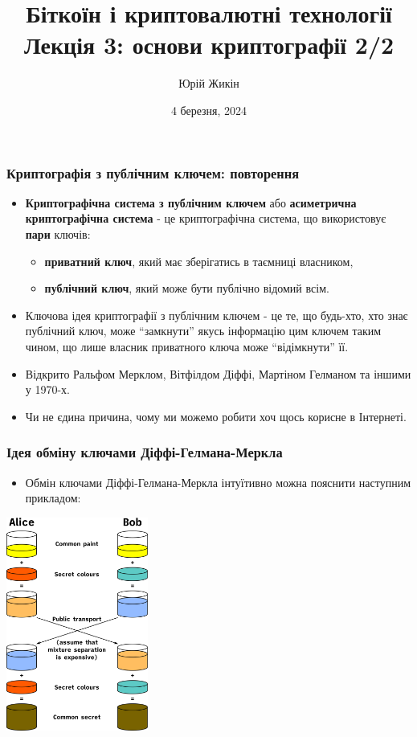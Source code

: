 \documentclass{beamer}
\title{
  Біткоїн і криптовалютні технології \\
  Лекція 3: основи криптографії 2/2
}
\author{Юрій Жикін}
\date{4 березня, 2024}
\begin{document}
\frame{\titlepage}

\begin{frame}
  \frametitle{Криптографія з публічним ключем: повторення}
  \begin{itemize}
  \item \textbf{Криптографічна система з публічним ключем} або \textbf{асиметрична
      криптографічна система} - це 
    криптографічна система, що використовує \textbf{пари} ключів:
    \begin{itemize}
    \item \textbf{приватний ключ}, який має зберігатись в таємниці власником,
    \item \textbf{публічний ключ}, який може бути публічно відомий всім.
    \end{itemize}
  \item Ключова ідея криптографії з публічним ключем - це те, що будь-хто, хто
    знає публічний ключ, може ``замкнути'' якусь інформацію цим ключем таким
    чином, що лише власник приватного ключа може ``відімкнути'' її.
  \item Відкрито Ральфом Мерклом, Вітфілдом Діффі, Мартіном Гелманом та іншими у
    1970-х.
  \item Чи не єдина причина, чому ми можемо робити хоч щось корисне в Інтернеті.
  \end{itemize}
\end{frame}

\begin{frame}
  \frametitle{Ідея обміну ключами Діффі-Гелмана-Меркла}
  \begin{itemize}
  \item Обмін ключами Діффі-Гелмана-Меркла інтуїтивно можна пояснити наступним
    прикладом:
  \end{itemize}
  \begin{center}
    \includegraphics[width=0.35\textwidth]{dh}
  \end{center}
\end{frame}
\end{document}
